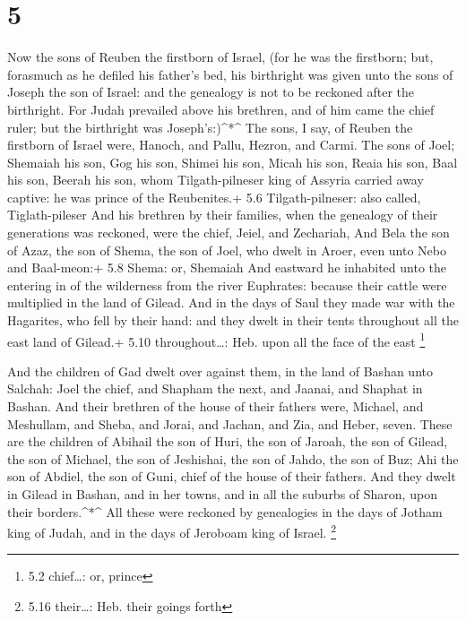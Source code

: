 \hypertarget{section-4}{%
\section{5}\label{section-4}}

 Now the sons of Reuben the firstborn of Israel, (for he was
the firstborn; but, forasmuch as he defiled his father's bed, his
birthright was given unto the sons of Joseph the son of Israel: and the
genealogy is not to be reckoned after the birthright.  For
Judah prevailed above his brethren, and of him came the chief ruler; but
the birthright was Joseph's:)\^{}*\^{}  The sons, I say, of
Reuben the firstborn of Israel were, Hanoch, and Pallu, Hezron, and
Carmi.  The sons of Joel; Shemaiah his son, Gog his son,
Shimei his son,  Micah his son, Reaia his son, Baal his son,
 Beerah his son, whom Tilgath-pilneser king of Assyria
carried away captive: he was prince of the Reubenites.+ 5.6
Tilgath-pilneser: also called, Tiglath-pileser  And his
brethren by their families, when the genealogy of their generations was
reckoned, were the chief, Jeiel, and Zechariah,  And Bela
the son of Azaz, the son of Shema, the son of Joel, who dwelt in Aroer,
even unto Nebo and Baal-meon:+ 5.8 Shema: or, Shemaiah  And
eastward he inhabited unto the entering in of the wilderness from the
river Euphrates: because their cattle were multiplied in the land of
Gilead.  And in the days of Saul they made war with the
Hagarites, who fell by their hand: and they dwelt in their tents
throughout all the east land of Gilead.+ 5.10 throughout\ldots: Heb.
upon all the face of the east \footnote{5.2 chief\ldots: or, prince}

 And the children of Gad dwelt over against them, in the
land of Bashan unto Salchah:  Joel the chief, and Shapham
the next, and Jaanai, and Shaphat in Bashan.  And their
brethren of the house of their fathers were, Michael, and Meshullam, and
Sheba, and Jorai, and Jachan, and Zia, and Heber, seven. 
These are the children of Abihail the son of Huri, the son of Jaroah,
the son of Gilead, the son of Michael, the son of Jeshishai, the son of
Jahdo, the son of Buz;  Ahi the son of Abdiel, the son of
Guni, chief of the house of their fathers.  And they dwelt
in Gilead in Bashan, and in her towns, and in all the suburbs of Sharon,
upon their borders.\^{}*\^{}  All these were reckoned by
genealogies in the days of Jotham king of Judah, and in the days of
Jeroboam king of Israel. \footnote{5.16 their\ldots: Heb. their goings
  forth}

